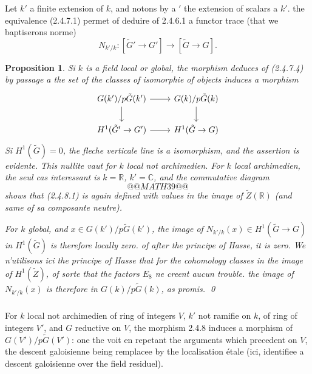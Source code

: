 \documentclass[12pt,a4paper]{article}
\theoremstyle{plain}
\newtheorem{proposition}[theorem]{Proposition}
\theoremstyle{definition}
\theoremstyle{remark}
\newcommand{\RR}{\mathbb{R}}
\newcommand{\CC}{\mathbb{C}}
\begin{document}
\subsubsection{}

Let $k'$ a finite extension of $k$, and notons by a $'$ the extension of scalars a $k'$. the equivalence (2.4.7.1) permet of deduire of 2.4.6.1 a functor trace (that we baptiserons norme)
\begin{equation}\label{eq:2.4.7.4}
N_{k'/k}: [\tilde{G}' \to G'] \to [\tilde{G} \to G].
\end{equation}

\begin{proposition}
Si $k$ is a field local or global, the morphism deduces of (2.4.7.4) by passage a the set of the classes of isomorphie of objects induces a morphism
\begin{equation}\label{eq:2.4.8.1}
\begin{tikzcd}
G(k')/p\tilde{G}(k') \arrow[r] \arrow[d] & G(k)/p\tilde{G}(k) \arrow[d] \\
H^1(\tilde{G}' \to G') \arrow[r] & H^1(\tilde{G} \to G)
\end{tikzcd}
\end{equation}
Si $H^1(\tilde{G}) = 0$, the fleche verticale line is a isomorphism, and the assertion is evidente. This nullite vaut for $k$ local not archimedien. For $k$ local archimedien, the seul cas interessant is $k = \RR$, $k' = \CC$, and the commutative diagram
\[
@@MATH39@@
\]
shows that (2.4.8.1) is again defined with values in the image of $\tilde{Z}(\RR)$ (and same of sa composante neutre).

For $k$ global, and $x \in G(k')/p\tilde{G}(k')$, the image of $N_{k'/k}(x) \in H^1(\tilde{G} \to G)$ in $H^1(\tilde{G})$ is therefore locally zero. of after the principe of Hasse, it is zero. We n'utilisons ici the principe of Hasse that for the cohomology classes in the image of $H^1(\tilde{Z})$, of sorte that the factors $E_8$ ne creent aucun trouble. the image of $N_{k'/k}(x)$ is therefore in $G(k)/p\tilde{G}(k)$, as promis.
\qed
\end{proposition}

\subsubsection{}

For $k$ local not archimedien of ring of integers $V$, $k'$ not ramifie on $k$, of ring of integers $V'$, and $G$ reductive on $V$, the morphism 2.4.8 induces a morphism of $G(V')/p\tilde{G}(V')$: one the voit en repetant the arguments which precedent on $V$, the descent galoisienne being remplacee by the localisation étale (ici, identifiee a descent galoisienne over the field residuel).
\end{document}
